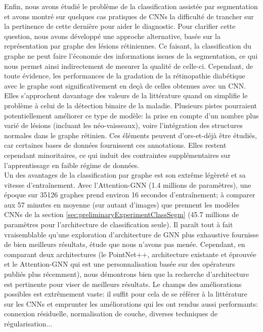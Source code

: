 Enfin, nous avons étudié le problème de la classification assistée par segmentation et avons montré sur quelques cas pratiques de CNNs la difficulté de trancher sur la pertinence de cette dernière pour aider le diagnostic. Pour clarifier cette question, nous avons développé une approche alternative, basée sur la représentation par graphe des lésions rétiniennes. Ce faisant, la classification du graphe ne peut faire l'économie des informations issues de la segmentation, ce qui nous permet ainsi indirectement de mesurer la qualité de celle-ci. Cependant, de toute évidence, les performances de la gradation de la rétinopathie diabétique avec le graphe sont significativement en deçà de celles obtenues avec un CNN. Elles s'approchent davantage des valeurs de la littérature quand on simplifie le problème à celui de la détection binaire de la maladie. 
Plusieurs pistes pourraient potentiellement améliorer ce type de modèle: la prise en compte d'un nombre plus varié de lésions (incluant les néo-vaisseaux), voire l'intégration des structures normales dans le graphe rétinien. Ces éléments peuvent d'ors-et-déjà être étudiés, car certaines bases de données fournissent ces annotations. Elles restent cependant minoritaires, ce qui induit des contraintes supplémentaires sur l'apprentissage en faible régime de données. \\
Un des avantages de la classification par graphe est son extrême légèreté et sa vitesse d'entraînement. Avec l'Attention-GNN (1.4 millions de paramètres), une époque sur 35126 graphes prend environ 16 secondes d'entraînement; à comparer aux 57 minutes en moyenne (sur autant d'images) que prennent les modèles CNNs de la section \ref{sec:preliminaryExperimentClassSegm} (45.7 millions de paramètres pour l'architecture de classification seule). Il paraît tout à fait vraisemblable qu'une exploration d'architecture de GNN plus exhaustive fournisse de bien meilleurs résultats, étude que nous n'avons pas menée. Cependant, en comparant deux architectures (le PointNet++, architecture existante et éprouvée et le Attention-GNN qui est une personnalisation basée sur des opérateurs publiés plus récemment), nous démontrons bien que la recherche d'architecture est pertinente pour viser de meilleurs résultats. Le champs des améliorations possibles est extrêmement vaste: il suffit pour cela de se référer à la littérature sur les CNNs et \og emprunter \fg les améliorations qui les ont rendus aussi performants: connexion résiduelle, normalisation de couche, diverses techniques de régularisation...

